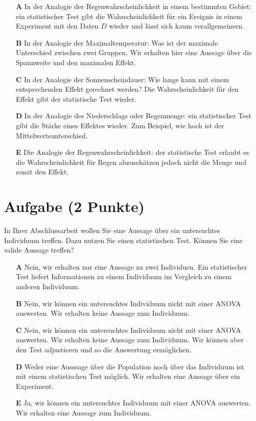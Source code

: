 \documentclass[a4paper, 9pt]{scrartcl}\usepackage[]{graphicx}\usepackage[]{xcolor}
\begin{document}
\begin{enumerate}
\item [\textbf{A} \msquare] In der Analogie der Regenwahrscheinlichkeit in einem bestimmten Gebiet: ein statistischer Test gibt die Wahrscheinlichkeit für ein Ereignis in einem Experiment mit den Daten $D$ wieder und lässt sich kaum verallgemeinern.
\item [\textbf{B} \msquare] In der Analogie der Maximaltemperatur: Was ist der maximale Unterschied zwischen zwei Gruppen. Wir erhalten hier eine Aussage über die Spannweite und den maximalen Effekt.
\item [\textbf{C} \msquare] In der Analogie der Sonnenscheindauer: Wie lange kann mit einem entsprechenden Effekt gerechnet werden? Die Wahrscheinlichkeit für den Effekt gibt der statistische Test wieder.
\item [\textbf{D} \msquare] In der Analogie des Niederschlags oder Regenmenge: ein statistischer Test gibt die Stärke eines Effektes wieder. Zum Beispiel, wie hoch ist der Mittelwertsunterschied.
\item [\textbf{E} \msquare] Die Analogie der Regenwahrscheinlichkeit: der statistische Test erlaubt es die Wahrscheinlichkeit für Regen abzuschätzen jedoch nicht die Menge und somit den Effekt.
\end{enumerate}

\section{Aufgabe \hfill (2 Punkte)}



In Ihrer Abschlussarbeit wollen Sie eine Aussage über ein untersuchtes Individuum treffen. Dazu nutzen Sie einen statistischen Test. Können Sie eine valide Aussage treffen?



\begin{enumerate}
\item [\textbf{A} \msquare] Nein, wir erhalten nur eine Aussage zu zwei Individuen. Ein statistischer Test liefert Informationen zu einem Individuum im Vergleich zu einem anderen Individuum.
\item [\textbf{B} \msquare] Nein, wir können ein untersuchtes Individuum nicht mit einer ANOVA auswerten. Wir erhalten keine Aussage zum Individuum.
\item [\textbf{C} \msquare] Nein, wir können ein untersuchtes Individuum nicht mit einer ANOVA auswerten. Wir erhalten keine Aussage zum Individuum. Wir können aber den Test adjustieren und so die Auswertung ermöglichen.
\item [\textbf{D} \msquare] Weder eine Ausssage über die Population noch über das Individuum ist mit einem statistischen Test möglich. Wir erhalten eine Aussage über ein Experiment.
\item [\textbf{E} \msquare] Ja, wir können ein untersuchtes Individuum mit einer ANOVA auswerten. Wir erhalten eine Aussage zum Individuum.
\end{enumerate}
\end{document}
